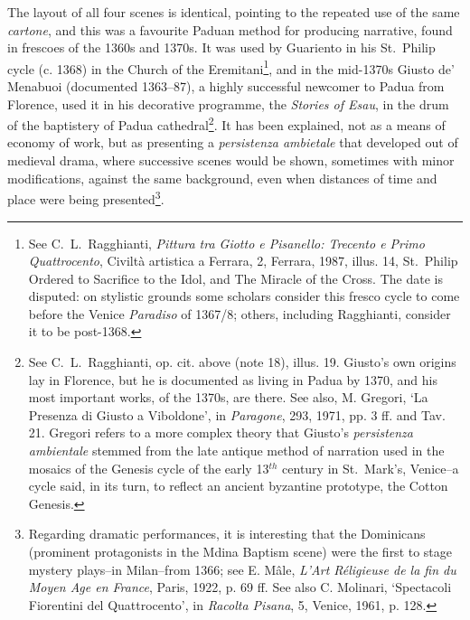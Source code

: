 \documentclass[a4paper,12pt]{article}
\begin{document}
The layout of all four scenes is identical, pointing to the repeated
use of the same \textit{cartone}, and this was a favourite Paduan
method for producing narrative, found in frescoes of the 1360s and
1370s. It was used by Guariento in his St.~Philip cycle (c. 1368) in
the Church of the Eremitani\footnote{See C.~L.~Ragghianti,
\textit{Pittura tra Giotto e Pisanello: Trecento e Primo
Quattrocento}, Civilt\`a artistica a Ferrara, 2, Ferrara, 1987,
illus. 14, St.~Philip Ordered to Sacrifice to the Idol, and The
Miracle of the Cross. The date is disputed: on stylistic grounds some
scholars consider this fresco cycle to come before the Venice
\textit{Paradiso} of 1367/8; others, including Ragghianti, consider it
to be post-1368.}, and in the mid-1370s Giusto de' Menabuoi
(documented 1363--87), a highly successful newcomer to Padua from
Florence, used it in his decorative programme, the \textit{Stories of
Esau}, in the drum of the baptistery of Padua cathedral\footnote{See
C.~L.~Ragghianti, op. cit. above (note 18), illus. 19.  Giusto's own
origins lay in Florence, but he is documented as living in Padua by
1370, and his most important works, of the 1370s, are there. See also,
M. Gregori, `La Presenza di Giusto a Viboldone', in \textit{Paragone},
293, 1971, pp. 3 ff. and Tav. 21. Gregori refers to a more complex
theory that Giusto's \textit{persistenza ambientale} stemmed from the
late antique method of narration used in the mosaics of the Genesis
cycle of the early 13$^{th}$ century in St.~Mark's, Venice--a cycle
said, in its turn, to reflect an ancient byzantine prototype, the
Cotton Genesis.}.  It has been explained, not as a means of economy of
work, but as presenting a \textit{persistenza ambietale} that
developed out of medieval drama, where successive scenes would be
shown, sometimes with minor modifications, against the same
background, even when distances of time and place were being
presented\footnote{Regarding dramatic performances, it is interesting
that the Dominicans (prominent protagonists in the Mdina Baptism
scene) were the first to stage mystery plays--in Milan--from 1366;
see E. M\^ale, \textit{L'Art R\'{e}ligieuse de la fin du Moyen Age en
France}, Paris, 1922, p. 69 ff.  See also C. Molinari, `Spectacoli
Fiorentini del Quattrocento', in \textit{Racolta Pisana}, 5, Venice,
1961, p. 128.}.
\end{document}
